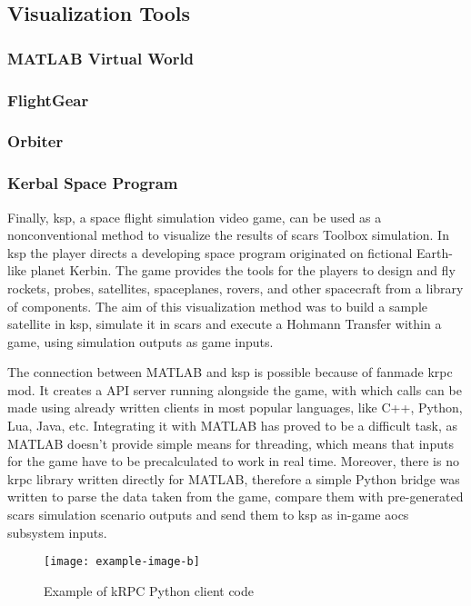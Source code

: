 \subsection{Visualization Tools}
    \subsubsection{MATLAB Virtual World}
    \subsubsection{FlightGear}
    \subsubsection{Orbiter}
    \subsubsection{Kerbal Space Program}
        Finally, \ac{ksp}, a space flight simulation video game, can be used as a nonconventional method to visualize the results of \ac{scars} Toolbox simulation. In \ac{ksp} the player directs a developing space program originated on fictional Earth-like planet Kerbin. The game provides the tools for the players to design and fly rockets, probes, satellites, spaceplanes, rovers, and other spacecraft from a library of components.\cite{kerbals} The aim of this visualization method was to build a sample satellite in \ac{ksp}, simulate it in \ac{scars} and execute a Hohmann Transfer within a game, using simulation outputs as game inputs.

        The connection between MATLAB and \ac{ksp} is possible because of fanmade \ac{krpc} mod. It creates a API server running alongside the game, with which calls can be made using already written clients in most popular languages, like C++, Python, Lua, Java, etc. Integrating it with MATLAB has proved to be a difficult task, as MATLAB doesn't provide simple means for threading, which means that inputs for the game have to be precalculated to work in real time. Moreover, there is no \ac{krpc} library written directly for MATLAB, therefore a simple Python bridge was written to parse the data taken from the game, compare them with pre-generated \ac{scars} simulation scenario outputs and send them to \ac{ksp} as in-game \ac{aocs} subsystem inputs.

        \begin{figure}[H]
            \centering
            \texttt{[image: example-image-b]}
            \caption{Example of kRPC Python client code}
            \label{fig:krcp}
        \end{figure}